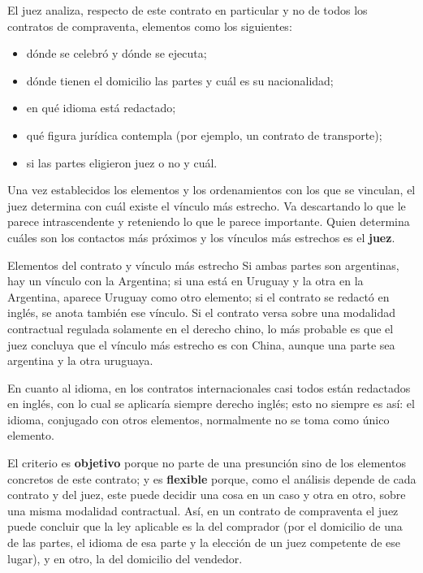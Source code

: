 \documentclass[12pt,oneside]{book}
\begin{document}
El juez analiza, respecto de este contrato en particular y no de todos los contratos de compraventa, elementos como los siguientes:

\begin{itemize}
    \item dónde se celebró y dónde se ejecuta;
    \item dónde tienen el domicilio las partes y cuál es su nacionalidad;
    \item en qué idioma está redactado;
    \item qué figura jurídica contempla (por ejemplo, un contrato de transporte);
    \item si las partes eligieron juez o no y cuál.
\end{itemize}

Una vez establecidos los elementos y los ordenamientos con los que se vinculan, el juez determina con cuál existe el vínculo más estrecho. Va descartando lo que le parece intrascendente y reteniendo lo que le parece importante. Quien determina cuáles son los contactos más próximos y los vínculos más estrechos es el \textbf{juez}.

\begin{example}{Elementos del contrato y vínculo más estrecho}
Si ambas partes son argentinas, hay un vínculo con la Argentina; si una está en Uruguay y la otra en la Argentina, aparece Uruguay como otro elemento; si el contrato se redactó en inglés, se anota también ese vínculo. Si el contrato versa sobre una modalidad contractual regulada solamente en el derecho chino, lo más probable es que el juez concluya que el vínculo más estrecho es con China, aunque una parte sea argentina y la otra uruguaya.

En cuanto al idioma, en los contratos internacionales casi todos están redactados en inglés, con lo cual se aplicaría siempre derecho inglés; esto no siempre es así: el idioma, conjugado con otros elementos, normalmente no se toma como único elemento.
\end{example}

El criterio es \textbf{objetivo} porque no parte de una presunción sino de los elementos concretos de este contrato; y es \textbf{flexible} porque, como el análisis depende de cada contrato y del juez, este puede decidir una cosa en un caso y otra en otro, sobre una misma modalidad contractual. Así, en un contrato de compraventa el juez puede concluir que la ley aplicable es la del comprador (por el domicilio de una de las partes, el idioma de esa parte y la elección de un juez competente de ese lugar), y en otro, la del domicilio del vendedor.
\end{document}
